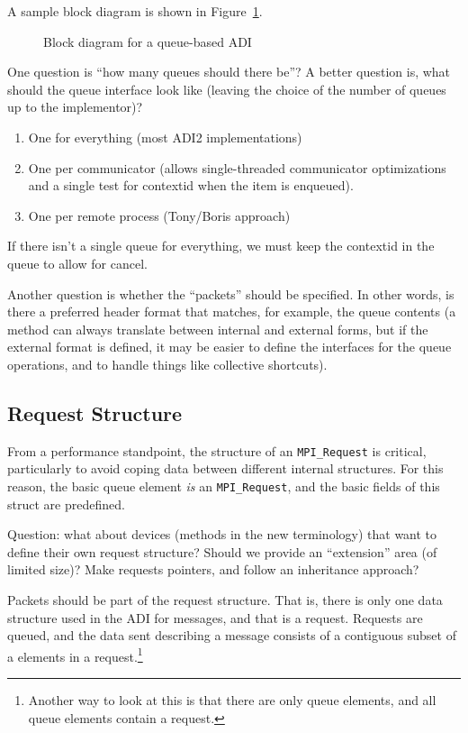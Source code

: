 \documentclass{article}
\begin{document}
A sample block diagram is shown in Figure~\ref{fig:block-diag}.

\begin{figure}
\centerline{}
\caption{Block diagram for a queue-based ADI}\label{fig:block-diag}
\end{figure}

One question is ``how many queues should there be''?  A better question is,
what should the queue interface look like (leaving the choice of the number of
queues up to the implementor)?

\begin{enumerate}
\item One for everything (most ADI2 implementations)
\item One per communicator (allows single-threaded communicator optimizations
  and a single test for contextid when the item is enqueued).
\item One per remote process (Tony/Boris approach)
\end{enumerate}

If there isn't a single queue for everything, we must keep the contextid in
the queue to allow for cancel.

Another question is whether the ``packets'' should be specified.  In other
words, is there a preferred header format that matches, for example, the queue
contents (a method can always translate between internal and external forms,
but if the external format is defined, it may be easier to define the
interfaces for the queue operations, and to handle things like collective
shortcuts).

\subsection{Request Structure}
From a performance standpoint, the structure of an \texttt{MPI\_Request} is
critical, particularly to avoid coping data between different internal
structures.  For this reason, the basic queue element \emph{is} an
\texttt{MPI\_Request}, and the basic fields of this struct are predefined.

Question: what about devices (methods in the new terminology) that want to
define their own request structure? 
Should we provide an ``extension'' area (of limited size)?  Make requests
pointers, and follow an inheritance approach?  

Packets should be part of the request structure.  That is, there is only one
data structure used in the ADI for messages, and that is a request.  Requests
are queued, and the data sent describing a message consists of a contiguous
subset of a elements in a request.\footnote{Another way to look at this is
  that there are only queue elements, and all queue elements contain a
  request.} 
\end{document}
